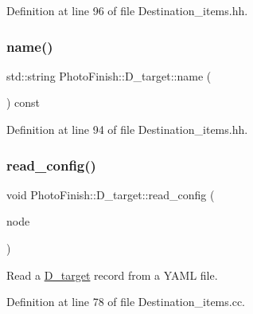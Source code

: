 Definition at line 96 of file Destination\+\_\+items.\+hh.

\mbox{\label{class_photo_finish_1_1_d__target_a93afbe63cd4deef0e714c3abc0e9b1db}} 
\subsubsection{\texorpdfstring{name()}{name()}}
{\footnotesize\ttfamily std\+::string Photo\+Finish\+::\+D\+\_\+target\+::name (\begin{DoxyParamCaption}\item[{void}]{ }\end{DoxyParamCaption}) const\hspace{0.3cm}{\ttfamily [inline]}}



Definition at line 94 of file Destination\+\_\+items.\+hh.

\mbox{\label{class_photo_finish_1_1_d__target_a7a5dce723f5908c120134bf95f2d252d}} 
\subsubsection{\texorpdfstring{read\+\_\+config()}{read\_config()}}
{\footnotesize\ttfamily void Photo\+Finish\+::\+D\+\_\+target\+::read\+\_\+config (\begin{DoxyParamCaption}\item[{const Y\+A\+M\+L\+::\+Node \&}]{node }\end{DoxyParamCaption})}



Read a \hyperlink{class_photo_finish_1_1_d__target}{D\+\_\+target} record from a Y\+A\+ML file. 



Definition at line 78 of file Destination\+\_\+items.\+cc.

\mbox{\label{class_photo_finish_1_1_d__target_ae004b2160f09fcfdac83e730e3595d42}} 
